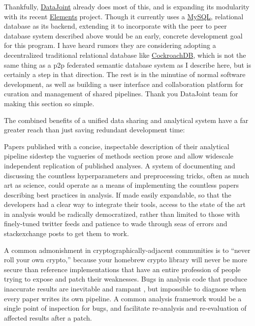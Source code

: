 \documentclass{article}
\begin{document}
Thankfully, \href{https://datajoint.io/}{DataJoint} already does most of
this, and is expanding its modularity with its recent
\href{https://github.com/datajoint/datajoint-elements}{Elements}
project. Though it currently uses a
\href{https://docs.datajoint.io/python/admin/1-hosting.html}{MySQL},
relational database as its backend, extending it to incorporate with the
peer to peer database system described above would be an early, concrete
development goal for this program. I have heard rumors they are
considering adopting a decentralized traditional relational database
like \href{https://www.cockroachlabs.com/product/}{CockroachDB}, which
is not the same thing as a p2p federated semantic database system as I
describe here, but is certainly a step in that direction. The rest is in
the minutiae of normal software development, as well as building a user
interface and collaboration platform for curation and management of
shared pipelines. Thank you DataJoint team for making this section so
simple.

The combined benefits of a unified data sharing and analytical system
have a far greater reach than just saving redundant development time:

Papers published with a concise, inspectable description of their
analytical pipeline sidestep the vagueries of methods section prose and
allow widescale independent replication of published analyses. A system
of documenting and discussing the countless hyperparameters and
preprocessing tricks, often as much art as science, could operate as a
means of implementing the countless papers describing best practices in
analysis. If made easily expandable, so that the developers had a clear
way to integrate their tools, access to the state of the art in analysis
would be radically democratized, rather than limited to those with
finely-tuned twitter feeds and patience to wade through seas of errors
and stackexchange posts to get them to work.

A common admonishment in cryptographically-adjacent communities is to
``never roll your own crypto,'' because your homebrew crypto library
will never be more secure than reference implementations that have an
entire profession of people trying to expose and patch their weaknesses.
Bugs in analysis code that produce inaccurate results are inevitable and
rampant \cite{millerScientistNightmareSoftware2006,
soergelRampantSoftwareErrors2015, eklundClusterFailureWhy2016a,
bhandarineupaneCharacterizationLeptazolinesPolar2019}, but
impossible to diagnose when every paper writes its own pipeline. A
common analysis framework would be a single point of inspection for
bugs, and facilitate re-analysis and re-evaluation of affected results
after a patch.
\end{document}

